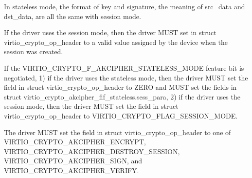 In stateless mode, the format of key and signature, the meaning of src_data and dst_data, are all the same
with session mode.


\begin{itemize*}
\item If the driver uses the session mode, then the driver MUST set
     in struct virtio_crypto_op_header to a valid
    value assigned by the device when the session was created.
\item If the VIRTIO_CRYPTO_F_AKCIPHER_STATELESS_MODE feature bit is negotiated, 1) if the
    driver uses the stateless mode, then the driver MUST set the  field in
    struct virtio_crypto_op_header to ZERO and MUST set the fields in struct
    virtio_crypto_akcipher_flf_stateless.sess_para, 2) if the driver uses the session
    mode, then the driver MUST set the  field in struct virtio_crypto_op_header
    to VIRTIO_CRYPTO_FLAG_SESSION_MODE.
\item The driver MUST set the  field in struct virtio_crypto_op_header
    to one of VIRTIO_CRYPTO_AKCIPHER_ENCRYPT, VIRTIO_CRYPTO_AKCIPHER_DESTROY_SESSION,
    VIRTIO_CRYPTO_AKCIPHER_SIGN, and VIRTIO_CRYPTO_AKCIPHER_VERIFY.
\end{itemize*}


